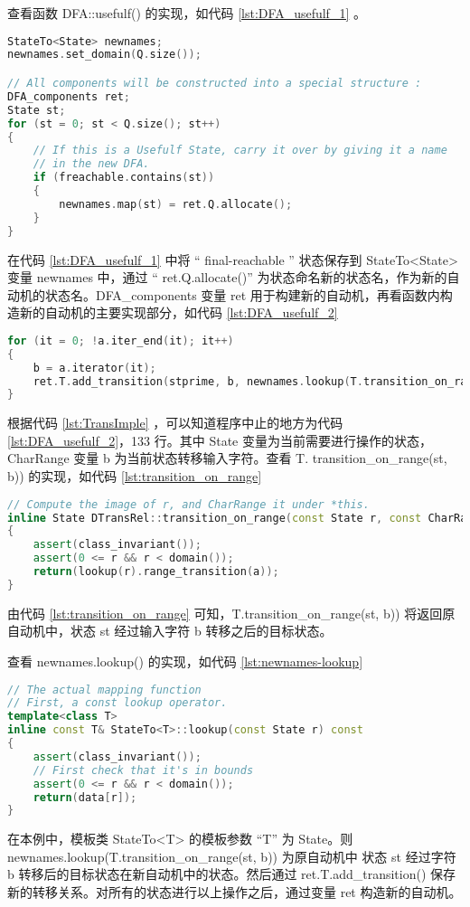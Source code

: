 查看函数 DFA::usefulf() 的实现，如代码 \ref{lst:DFA_usefulf_1} 。
\lstset{style=mystyle}
\begin{lstlisting}[language=C++,label={lst:DFA_usefulf_1},caption={ DFA.cpp },firstnumber=84]
StateTo<State> newnames;
newnames.set_domain(Q.size());

// All components will be constructed into a special structure :
DFA_components ret;
State st;
for (st = 0; st < Q.size(); st++)
{
    // If this is a Usefulf State, carry it over by giving it a name
    // in the new DFA.
    if (freachable.contains(st))
    {
        newnames.map(st) = ret.Q.allocate();
    }
}
\end{lstlisting}
在代码 \ref{lst:DFA_usefulf_1} 中将 “ final-reachable ” 状态保存到 StateTo<State> 变量 newnames 中，通过 “ ret.Q.allocate()” 为状态命名新的状态名，作为新的自动机的状态名。DFA\_components 变量 ret 用于构建新的自动机，再看函数内构造新的自动机的主要实现部分，如代码 \ref{lst:DFA_usefulf_2}
\lstset{style=mystyle}
\begin{lstlisting}[language=C++,label={lst:DFA_usefulf_2},caption={ DFA.cpp },firstnumber=130]
for (it = 0; !a.iter_end(it); it++)
{
    b = a.iterator(it);
    ret.T.add_transition(stprime, b, newnames.lookup(T.transition_on_range(st, b)));
}
\end{lstlisting}

根据代码 \ref{lst:TransImple} ，可以知道程序中止的地方为代码 \ref{lst:DFA_usefulf_2}，133 行。其中 State 变量为当前需要进行操作的状态，CharRange 变量 b 为当前状态转移输入字符。查看 T.
transition\_on\_range(st, b)) 的实现，如代码 \ref{lst:transition_on_range}
\lstset{style=mystyle}
\begin{lstlisting}[language=C++,label={lst:transition_on_range},caption={ DTransRel.cpp },firstnumber=108]
// Compute the image of r, and CharRange it under *this.
inline State DTransRel::transition_on_range(const State r, const CharRange a) const
{
    assert(class_invariant());
    assert(0 <= r && r < domain());
    return(lookup(r).range_transition(a));
}
\end{lstlisting}
由代码 \ref{lst:transition_on_range} 可知，T.transition\_on\_range(st, b)) 将返回原自动机中，状态 st 经过输入字符 b 转移之后的目标状态。

查看 newnames.lookup() 的实现，如代码 \ref{lst:newnames-lookup}
\lstset{style=mystyle}
\begin{lstlisting}[language=C++,label={lst:newnames-lookup},caption={ StateTo.h },firstnumber=177]
// The actual mapping function
// First, a const lookup operator.
template<class T>
inline const T& StateTo<T>::lookup(const State r) const
{
    assert(class_invariant());
    // First check that it's in bounds
    assert(0 <= r && r < domain());
    return(data[r]);
}
\end{lstlisting}
在本例中，模板类 StateTo<T> 的模板参数 “T” 为 State。则 newnames.lookup(T.transition\_on\_range(st, b)) 为原自动机中 状态 st 经过字符 b 转移后的目标状态在新自动机中的状态。然后通过 ret.T.add\_transition() 保存新的转移关系。对所有的状态进行以上操作之后，通过变量 ret 构造新的自动机。 

